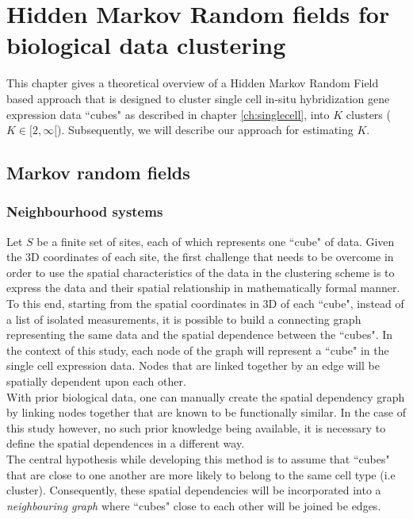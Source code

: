 \chapter{Hidden Markov Random fields for biological data clustering}\label{ch:HMRF} 
This chapter gives a theoretical overview of a Hidden Markov Random Field based approach that is designed to cluster single cell in-situ hybridization gene expression data ``cubes" as described in chapter \ref{ch:singlecell}, into $K$ clusters ($K \in [2,\infty[$). Subsequently, we will describe our approach for estimating $K$.

\section{Markov random fields}

	\subsection{Neighbourhood systems}\label{sec:neighbours}
Let $S$ be a finite set of sites, each of which represents one ``cube" of data. Given the 3D coordinates of each site, the first challenge that needs to be overcome in order to use the spatial characteristics of the data in the clustering scheme is to express the data and their spatial relationship in mathematically formal manner. To this end, starting from the spatial coordinates in 3D of each ``cube", instead of a list of isolated measurements, it is possible to build a connecting graph representing the same data and the spatial dependence between the ``cubes". In the context of this study, each node of the graph will represent a ``cube" in the single cell expression data. Nodes that are linked together by an edge will be spatially dependent upon each other.\\

With prior biological data, one can manually create the spatial dependency graph by linking nodes together that are known to be functionally similar. In the case of this study however, no such prior knowledge being available, it is necessary to define the spatial dependences in a different way.\\

The central hypothesis while developing this method is to assume that ``cubes" that are close to one another are more likely to belong to the same cell type (i.e cluster). Consequently, these spatial dependencies will be incorporated into a \emph{neighbouring graph} where  ``cubes" close to each other will be joined be edges.\\

